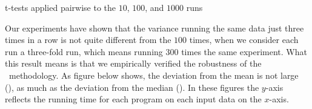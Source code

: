 \begin{table}
  \centering
  \begin{tiny}
  
  \end{tiny}
  \caption{t-tests applied pairwise to the $10$, $100$, and $1000$ runs}
  \label{tab:ttest}
\end{table}


Our experiments have shown that the variance running the same data just three times in a row is not quite different from the $100$ times, when we consider each run a three-fold run, which means running $300$ times the same experiment. What this result means is that we empirically verified the robustness of the \CP\ methodology. As figure  below shows, the deviation from the mean is not large (), as much as the deviation from the median ().  In these figures the $y$-axis reflects the running time for each program on each input data on the $x$-axis.

